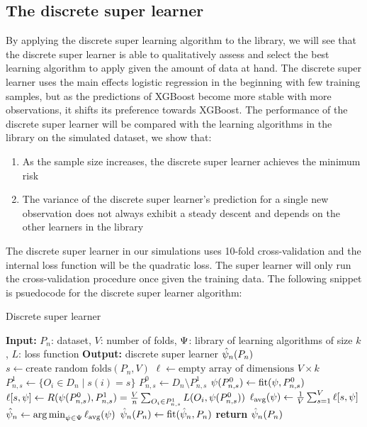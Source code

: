 \documentclass[./main.tex]{subfiles}
\begin{document}
\subsection{The discrete super learner}
By applying the discrete super learning algorithm to the library, we will see that the discrete super learner is able to qualitatively assess and select the best learning algorithm to apply given the amount of data at hand. The discrete super learner uses the main effects logistic regression in the beginning with few training samples, but as the predictions of XGBoost become more stable with more observations, it shifts its preference towards XGBoost. The performance of the discrete super learner will be compared with the learning algorithms in the library on the simulated dataset, we show that:
\begin{enumerate}
    \item As the sample size increases, the discrete super learner achieves the minimum risk 
    \item The variance of the discrete super learner's prediction for a single new observation does not always exhibit a steady descent and depends on the other learners in the library
\end{enumerate}
The discrete super learner in our simulations uses 10-fold cross-validation and the internal loss function will be the quadratic loss. The super learner will only run the cross-validation procedure once given the training data. The following snippet is psuedocode for the discrete super learner algorithm:
\begin{algorithm}[H]
\caption{Discrete super learner}
\begin{algorithmic}[1]
\State \textbf{Input:} $P_n$: dataset, $V$: number of folds, $ \Psi $: library of learning algorithms of size $ k $, $ L $: loss function
\State \textbf{Output:} discrete super learner $ \hat{\psi}_n(P_n) $
\State $s \gets \text{create random folds}(P_n, V)$ 
\State $\ell \gets \text{empty array of dimensions } V \times k$  
    \State $P_{n, s}^{1} \gets \{O_i \in D_n \mid s(i) = s\} $
    \State $P_{n, s}^{0} \gets D_n \setminus P_{n,s}^{1} $
    \For{$\la \in \lib$}
    \State $ \psi(P_{n,s}^{0}) \gets \text{fit}(\psi, P_{n, s}^{0})$
    \State $\ell[s,\psi] \gets R(\psi(P_{n, s}^{0}), P_{n,s}^{1}) = \frac{V}{n} \sum_{O_i \in P_{n,s}^{1}} L(O_i, \psi(P_{n, s}^{0})) $
    \EndFor
\EndFor
\State $ \ell_{\text{avg}}(\psi) \gets \frac{1}{V} \sum_{s = 1}^{V} \ell[s,\psi] $ 
\State $ \hat{\psi}_n \gets \operatorname*{arg\,min}_{\psi \in \Psi} \ell_{\text{avg}}(\psi) $
\State $ \hat{\psi}_n(P_n) \gets \text{fit}(\hat{\psi}_n, P_n) $  
\State \textbf{return} $ \hat{\psi}_n(P_n) $
\end{algorithmic}
\end{algorithm}
\end{document}
